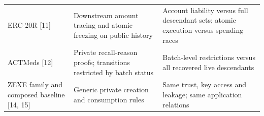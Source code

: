 \begin{table}[htbp]
\begin{tabularx}{\linewidth}{@{}XXX@{}}
        ERC-20R [11]                               & Downstream amount tracing and atomic freezing on public history        & Account liability versus full descendant sets; atomic execution versus spending races \\
        ACTMeds [12]                               & Private recall-reason proofs; transitions restricted by batch status   & Batch-level restrictions versus all recovered live descendants                        \\
        ZEXE family and composed baseline [14, 15] & Generic private creation and consumption rules                         & Same trust, key access and leakage; same application relations                        \\
        \bottomrule\end{tabularx}\end{table}
